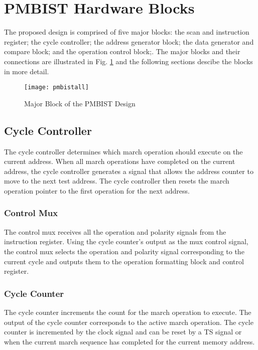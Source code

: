\section{PMBIST Hardware Blocks}
\label{sect:bg-blocks}
The proposed design is comprised of five major blocks: the scan and instruction register; the cycle controller; the address generator block; the data generator and compare block; and the operation control block;.  The major blocks and their connections are illustrated in Fig. \ref{fig:pmbistall} and the following sections descibe the blocks in more detail.

\begin{figure}[h]
  \centering
  \texttt{[image: pmbistall]}
  \caption{Major Block of the PMBIST Design}
  \label{fig:pmbistall}
\end{figure}

\subsection{Cycle Controller}
The cycle controller determines which march operation should execute on the current address.  When all march operations have completed on the current address, the cycle controller generates a signal that allows the address counter to move to the next test address.  The cycle controller then resets the march operation pointer to the first operation for the next address.   

\subsubsection{Control Mux}
The control mux receives all the operation and polarity signals from the instruction register.  Using the cycle counter's output as the mux control signal, the control mux selects the operation and polarity signal corresponding to the current cycle and outputs them to the operation formatting block and control register.  

\subsubsection{Cycle Counter}
The cycle counter increments the count for the march operation to execute.  The output of the cycle counter corresponds to the active march operation.  The cycle counter is incremented by the clock signal and can be reset by a TS signal or when the current march sequence has completed for the current memory address. 

